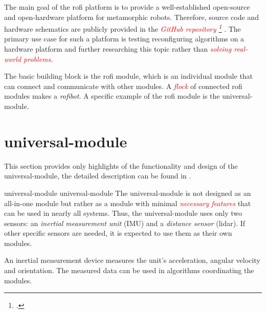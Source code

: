 \documentclass[
  digital,     %
  oneside,     %
  nosansbold,  %
  nocolorbold, %
  nolof,         %
  nolot,         %
]{fithesis4}
\newcommand{\TODO}[1]{\textcolor{red}{\textit{#1}}}
\newcommand{\TODOLIST}[1]{}
\begin{document}
The main goal of the \acrshort{rofi} platform is to provide a well-established open-source and open-hardware platform for metamorphic robots. Therefore, source code and hardware schematics are publicly provided in the \TODO{ GitHub repository \footcite[\url{https://github.com/paradise-fi/RoFI}]{rofi-github} }. The primary use case for such a platform is testing reconfiguring algorithms on a hardware platform and further researching this topic rather than \TODO{solving real-world problems}.

The basic building block is the \acrshort{rofi} module, which is an individual module that can connect and communicate with other modules. A \TODO{flock} of connected \acrshort{rofi} modules makes a \emph{\gls{rofibot}}. A specific example of the \acrshort{rofi} module is the \gls{universal-module}.


\section[ Universal Module ]{ \gls{universal-module} }
\TODOLIST{
    \begin{itemize}
        \item ESP32
        \item \acrshort{spi}
        \item \acrshort{uart}
        \item accumulator
        \item EXT and INT power lines
        \item 3 motors
        \item 6 docks
    \end{itemize}
}
This section provides only highlights of the functionality and design of the \gls{universal-module}, the detailed description can be found in \cite[chapter~3]{Mrazek2019thesis}.

\gls{universal-module} \glsdesc{universal-module} The \gls{universal-module} is not designed as an all-in-one module but rather as a module with minimal \TODO{necessary features} that can be used in nearly all systems. Thus, the \gls{universal-module} uses only two sensors: an \emph{inertial measurement unit} (IMU) and a \emph{distance sensor} (\acrshort{lidar}). If other specific sensors are needed, it is expected to use them as their own modules.

An inertial measurement device measures the unit's acceleration, angular velocity and orientation. The measured data can be used in algorithms coordinating the modules.
\end{document}
